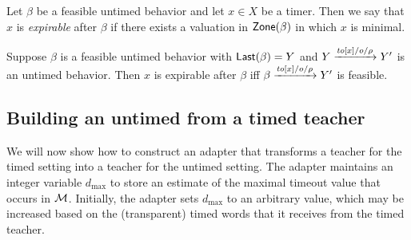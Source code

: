 Let $\beta$ be a feasible untimed behavior and let $x \in X$ be a timer. Then we say that $x$ is \emph{expirable} after $\beta$
if there exists a valuation in $\mathsf{Zone}({\beta})$ in which $x$ is minimal.

\begin{lemma}
\label{expirable}
Suppose $\beta$ is a feasible untimed behavior with $\mathsf{Last}({\beta}) = Y$ and $Y \xrightarrow{\mathit{to}[x]/o/\rho} Y'$ is an untimed behavior.
Then $x$ is expirable after $\beta$ iff $\beta \xrightarrow{\mathit{to}[x]/o/\rho} Y'$ is feasible.
\end{lemma}



\subsection{Building an untimed from a timed teacher}
We will now show how to construct an adapter that transforms a teacher for the timed setting into a teacher for the untimed setting.
The adapter maintains an integer variable $d_{\max}$ to store an estimate of the maximal timeout value that occurs in ${\mathcal M}$. Initially, the
adapter sets $d_{\max}$ to an arbitrary value, which may be increased based on the (transparent) timed words that it receives from
the timed teacher.

